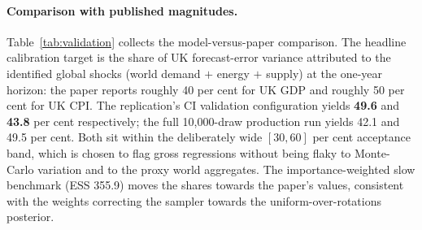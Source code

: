 \paragraph{Comparison with published magnitudes.} Table~\ref{tab:validation} collects the model-versus-paper comparison. The headline calibration target is the share of UK forecast-error variance attributed to the identified global shocks (world demand $+$ energy $+$ supply) at the one-year horizon: the paper reports roughly 40 per cent for UK GDP and roughly 50 per cent for UK CPI. The replication's CI validation configuration yields \textbf{49.6} and \textbf{43.8} per cent respectively; the full 10{,}000-draw production run yields 42.1 and 49.5 per cent. Both sit within the deliberately wide $[30, 60]$ per cent acceptance band, which is chosen to flag gross regressions without being flaky to Monte-Carlo variation and to the proxy world aggregates. The importance-weighted slow benchmark (ESS 355.9) moves the shares towards the paper's values, consistent with the weights correcting the \citet{arias2018} sampler towards the uniform-over-rotations posterior.

